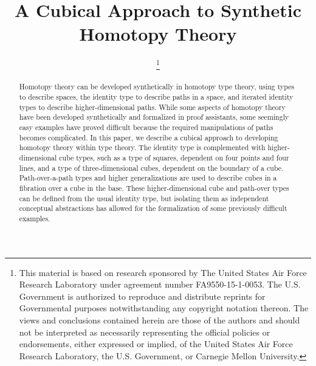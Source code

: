 \documentclass[conference, compsocconf]{drl-common/IEEEtran}
\begin{document}
\title{A Cubical Approach to Synthetic Homotopy Theory}

\author{
\and
{}

\thanks{
This material is based on research sponsored by The United States Air
Force Research Laboratory under agreement number FA9550-15-1-0053. The
U.S. Government is authorized to reproduce and distribute reprints for
Governmental purposes notwithstanding any copyright notation thereon.
The views and conclusions contained herein are those of the authors and
should not be interpreted as necessarily representing the official
policies or endorsements, either expressed or implied, of the United
States Air Force Research Laboratory, the U.S. Government, or Carnegie
Mellon University.
}

}

\maketitle

\begin{abstract}
Homotopy theory can be developed synthetically in homotopy type theory, using types to describe spaces, the identity type to describe paths in a space, and iterated identity types to describe higher-dimensional paths. While some aspects of homotopy theory have been developed synthetically and formalized in proof assistants, some seemingly easy examples have proved difficult because the required manipulations of paths becomes complicated.  In this paper, we describe a cubical approach to developing homotopy theory within type theory.  The identity type is complemented with higher-dimensional cube types, such as a type of squares, dependent on four points and four lines, and a type of three-dimensional cubes, dependent on the boundary of a cube. Path-over-a-path types and higher generalizations are used to describe cubes in a fibration over a cube in the base.  These higher-dimensional cube and path-over types can be defined from the usual identity type, but isolating them as independent conceptual abstractions has allowed for the formalization of some previously difficult examples.
\end{abstract}
\end{document}
